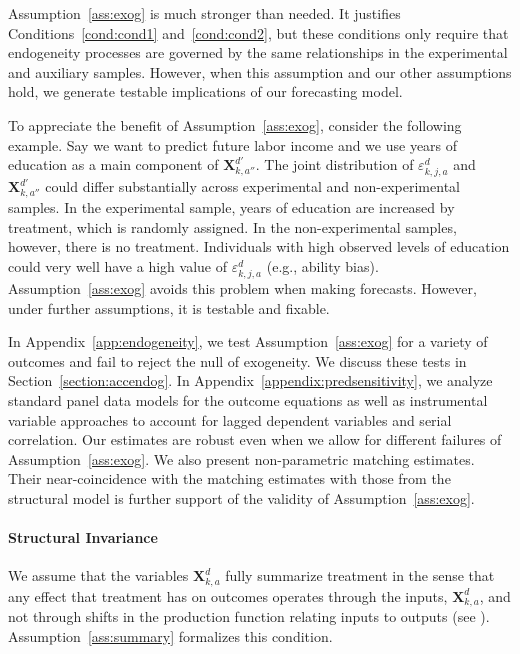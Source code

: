 \noindent Assumption~\ref{ass:exog} is much stronger than needed. It justifies Conditions~\ref{cond:cond1} and~\ref{cond:cond2}, but these conditions only require that endogeneity processes are governed by the same relationships in the experimental and auxiliary samples. However, when this assumption and our other assumptions hold, we generate testable implications of our forecasting model.

\noindent To appreciate the benefit of Assumption~\ref{ass:exog}, consider the following example. Say we want to predict future labor income and we use years of education as a main component of $\bm{X}_{k,{a''}}^{d'}$. The joint distribution of $\varepsilon_{k,j,a}^d$ and $\bm{X}_{k,{a''}}^{d'}$ could differ substantially across experimental and non-experimental samples. In the experimental sample, years of education are increased by treatment, which is randomly assigned. In the non-experimental samples, however, there is no treatment. Individuals with high observed levels of education could very well have a high value of  $\varepsilon_{k,j,a}^d$ (e.g., ability bias). Assumption~\ref{ass:exog} avoids this problem when making forecasts. However, under further assumptions, it is testable and fixable.

\noindent In Appendix~\ref{app:endogeneity}, we test Assumption~\ref{ass:exog} for a variety of outcomes and fail to reject the null of exogeneity. We discuss these tests in Section~\ref{section:accendog}. In Appendix~\ref{appendix:predsensitivity}, we analyze standard panel data models for the outcome equations as well as instrumental variable approaches to account for lagged dependent variables and serial correlation. Our estimates are robust even when we allow for different failures of Assumption~\ref{ass:exog}. We also present non-parametric matching estimates. Their near-coincidence with the matching estimates with those from the structural model is further support of the validity of Assumption~\ref{ass:exog}.

\paragraph{Structural Invariance} \label{sec:structural-invariance}

\noindent We assume that the variables $\bm{X}_{k,a}^d$ fully summarize treatment in the sense that any effect that treatment has on outcomes operates through the inputs, $\bm{X}_{k,a}^d$, and not through shifts in the production function relating inputs to outputs (see \citealp{Heckman_Pinto_etal_2013_PerryFactor}). Assumption~\ref{ass:summary} formalizes this condition.

